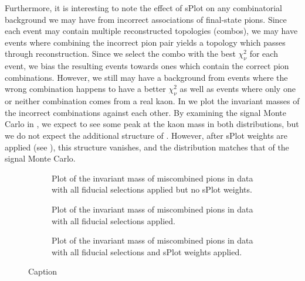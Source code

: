 Furthermore, it is interesting to note the effect of sPlot on any combinatorial background we may have from incorrect associations of final-state pions. Since each event may contain multiple reconstructed topologies (combos), we may have events where combining the incorrect pion pair yields a topology which passes through reconstruction. Since we select the combo with the best $\chi^2_\nu$ for each event, we bias the resulting events towards ones which contain the correct pion combinations. However, we still may have a background from events where the wrong combination happens to have a better $\chi^2_\nu$ as well as events where only one or neither combination comes from a real kaon. In  we plot the invariant masses of the incorrect combinations against each other. By examining the signal Monte Carlo in , we expect to see some peak at the kaon mass in both distributions, but we do not expect the additional structure of . However, after sPlot weights are applied (see ), this structure vanishes, and the distribution matches that of the signal Monte Carlo.

\begin{figure}
    \centering
    \begin{subfigure}{0.45\textwidth}
      
      \caption{Plot of the invariant mass of miscombined pions in data with all fiducial selections applied but no sPlot weights.}\label{fig:hypo-ks12-v-ks21-data-pz-masscut-chisqdof-3.0-mesons}
    \end{subfigure}
    \hfill
    \begin{subfigure}{0.45\textwidth}
      
      \caption{Plot of the invariant mass of miscombined pions in data with all fiducial selections applied.}\label{fig:hypo-ks12-v-ks21-sigmc-pz-masscut-chisqdof-3.0-mesons}
    \end{subfigure}
    \vspace{1em}
    \begin{subfigure}{0.8\textwidth}
      
      \caption{Plot of the invariant mass of miscombined pions in data with all fiducial selections and sPlot weights applied.}\label{fig:hypo-ks12-v-ks21-data-pz-masscut-chisqdof-3.0-mesons-free-2}
    \end{subfigure}

  \caption{Caption}\label{fig:hypo-ks12-v-ks21}
\end{figure}

